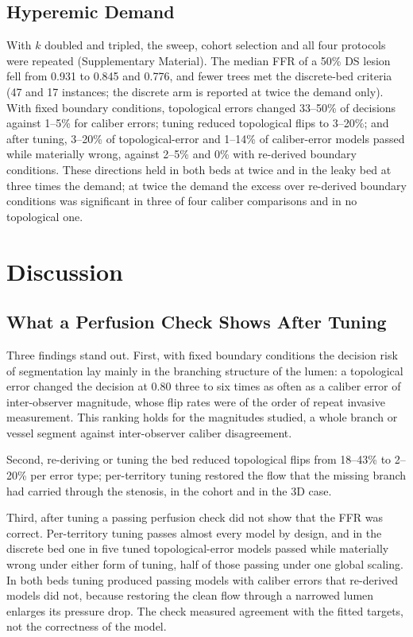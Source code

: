 \documentclass[journal,twoside,web]{ieeecolor}
\begin{document}
\subsection{Hyperemic Demand}\label{sec:demand}
With $k$ doubled and tripled, the sweep, cohort selection and all four protocols were repeated (Supplementary
Material). The median FFR of a 50\% DS lesion fell from 0.931 to 0.845 and 0.776, and fewer trees met the discrete-bed
criteria (47 and 17 instances; the discrete arm is reported at twice the demand only).
With fixed boundary conditions, topological errors changed 33--50\% of decisions against 1--5\% for caliber errors;
tuning reduced topological flips to 3--20\%; and after tuning, 3--20\% of topological-error and 1--14\% of
caliber-error models passed while materially wrong, against 2--5\% and 0\% with re-derived boundary conditions. These
directions held in both beds at twice and in the leaky bed at three times the demand; at twice the demand the
excess over re-derived boundary conditions was significant in three of four caliber comparisons and in no
topological one.

\section{Discussion}
\subsection{What a Perfusion Check Shows After Tuning}
Three findings stand out. First, with fixed boundary conditions the decision risk of segmentation lay mainly in the branching
structure of the lumen: a topological error changed the decision at 0.80 three to six times as often as a caliber
error of inter-observer magnitude, whose flip rates were of the order of repeat invasive measurement. This ranking
holds for the magnitudes studied, a whole branch or vessel segment against inter-observer caliber disagreement.

Second, re-deriving or tuning the bed reduced topological flips from 18--43\% to 2--20\% per error type; per-territory
tuning restored the flow that the missing branch had carried through the stenosis, in the cohort and in the 3D case.

Third, after tuning a passing perfusion check did not show that the FFR was correct. Per-territory tuning passes
almost every model by design, and in the discrete bed one in five tuned topological-error models passed while
materially wrong under either form of tuning, half of those passing under one global scaling. In both beds tuning produced passing models with
caliber errors that re-derived models did not, because restoring the clean flow through a narrowed lumen enlarges
its pressure drop. The check measured agreement with the fitted targets, not the correctness of the model.
\end{document}

